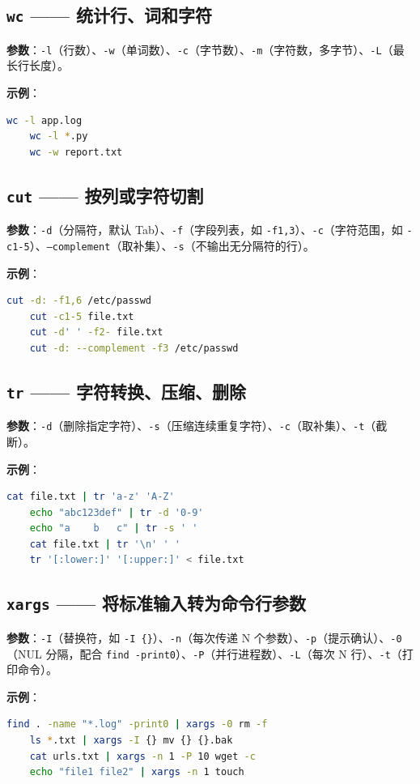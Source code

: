 \subsection{\texttt{wc} —— 统计行、词和字符} \textbf{参数}：\texttt{-l}（行数）、\texttt{-w}（单词数）、\texttt{-c}（字节数）、\texttt{-m}（字符数，多字节）、\texttt{-L}（最长行长度）。

\textbf{示例}：
\begin{lstlisting}[language=bash]
	wc -l app.log
	wc -l *.py
	wc -w report.txt
\end{lstlisting}

\subsection{\texttt{cut} —— 按列或字符切割} \textbf{参数}：\texttt{-d}（分隔符，默认 Tab）、\texttt{-f}（字段列表，如 \texttt{-f1,3}）、\texttt{-c}（字符范围，如 \texttt{-c1-5}）、\texttt{--complement}（取补集）、\texttt{-s}（不输出无分隔符的行）。

\textbf{示例}：
\begin{lstlisting}[language=bash]
	cut -d: -f1,6 /etc/passwd
	cut -c1-5 file.txt
	cut -d' ' -f2- file.txt
	cut -d: --complement -f3 /etc/passwd
\end{lstlisting}

\subsection{\texttt{tr} —— 字符转换、压缩、删除} \textbf{参数}：\texttt{-d}（删除指定字符）、\texttt{-s}（压缩连续重复字符）、\texttt{-c}（取补集）、\texttt{-t}（截断）。

\textbf{示例}：
\begin{lstlisting}[language=bash]
	cat file.txt | tr 'a-z' 'A-Z'
	echo "abc123def" | tr -d '0-9'
	echo "a    b   c" | tr -s ' '
	cat file.txt | tr '\n' ' '
	tr '[:lower:]' '[:upper:]' < file.txt
\end{lstlisting}

\subsection{\texttt{xargs} —— 将标准输入转为命令行参数} \textbf{参数}：\texttt{-I}（替换符，如 \texttt{-I \{\}}）、\texttt{-n}（每次传递 N 个参数）、\texttt{-p}（提示确认）、\texttt{-0}（NUL 分隔，配合 \texttt{find -print0}）、\texttt{-P}（并行进程数）、\texttt{-L}（每次 N 行）、\texttt{-t}（打印命令）。

\textbf{示例}：
\begin{lstlisting}[language=bash]
	find . -name "*.log" -print0 | xargs -0 rm -f
	ls *.txt | xargs -I {} mv {} {}.bak
	cat urls.txt | xargs -n 1 -P 10 wget -c
	echo "file1 file2" | xargs -n 1 touch
\end{lstlisting}

